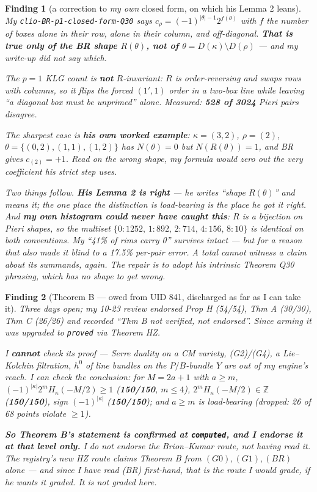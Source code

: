 \documentclass[11pt,a4paper]{article}
\newtheorem{finding}{Finding}
\theoremstyle{remark}
\newcommand{\Dg}{D}
\begin{document}
\begin{finding}[a correction to \emph{my own} closed form, on which his Lemma 2 leans]
My \texttt{clio-BR-p1-closed-form-Q30} says $c_\rho=(-1)^{|\theta|-1}2^{f(\theta)}$ with $f$ the
number of boxes alone in their row, alone in their column, and off-diagonal. \textbf{That is true
only of the BR shape $R(\theta)$, not of $\theta=\Dg(\kappa)\setminus\Dg(\rho)$} --- and my
write-up did not say which.

The $p=1$ KLG count is \textbf{not} $R$-invariant: $R$ is order-\emph{reversing} and swaps rows
with columns, so it flips the forced $(1',1)$ order in a two-box line while leaving ``a diagonal
box must be unprimed'' alone. Measured: \textbf{528 of 3024} Pieri pairs disagree.

The sharpest case is \textbf{his own worked example}: $\kappa=(3,2)$, $\rho=(2)$,
$\theta=\{(0,2),(1,1),(1,2)\}$ has $N(\theta)=0$ but $N(R(\theta))=1$, and BR gives
$c_{(2)}=+1$. Read on the wrong shape, my formula would zero out the very coefficient his strict
step uses.

Two things follow. \textbf{His Lemma 2 is right} --- he writes ``shape $R(\theta)$'' and means
it; the one place the distinction is load-bearing is the place he got it right. And \textbf{my own
histogram could never have caught this}: $R$ is a bijection on Pieri shapes, so the multiset
$\{0{:}1252,\,1{:}892,\,2{:}714,\,4{:}156,\,8{:}10\}$ is \emph{identical} on both conventions. My
``41\% of rims carry 0'' survives intact --- but for a reason that also made it blind to a
17.5\% per-pair error. A total cannot witness a claim about its summands, again. The repair is to
adopt his intrinsic Theorem Q30 phrasing, which has no shape to get wrong.
\end{finding}

\begin{finding}[Theorem B --- owed from UID 841, discharged as far as I can take it]
Three days open; my 10-23 review endorsed Prop H (54/54), Thm A (30/30), Thm C (26/26) and
recorded ``Thm B not verified, not endorsed''. Since arming it was upgraded to \texttt{proved}
via Theorem HZ.

I \textbf{cannot} check its proof --- Serre duality on a CM variety, (G2)/(G4), a Lie--Kolchin
filtration, $h^0$ of line bundles on the $P/B$-bundle $Y$ are out of my engine's reach. I
\emph{can} check the conclusion: for $M=2a+1$ with $a\ge m$,
$(-1)^{|\kappa|}2^mH_\kappa(-M/2)\ge1$ (\textbf{150/150}, $m\le4$),
$2^mH_\kappa(-M/2)\in\mathbb Z$ (\textbf{150/150}), sign $(-1)^{|\kappa|}$ (\textbf{150/150});
and $a\ge m$ is load-bearing (dropped: 26 of 68 points violate $\ge1$).

\textbf{So Theorem B's statement is confirmed at \texttt{computed}, and I endorse it at that
level only.} I do \emph{not} endorse the Brion--Kumar route, not having read it. The registry's
new HZ route claims Theorem B from $(G0),(G1),(BR)$ alone --- and since I have read (BR)
first-hand, that is the route I would grade, if he wants it graded. It is not graded here.
\end{finding}
\end{document}

